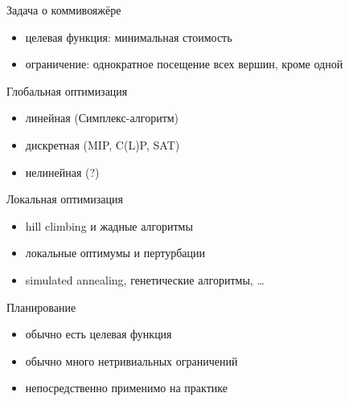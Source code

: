 \documentclass[10pt]{beamer}
\begin{document}
\begin{frame}{Задача о коммивояжёре}
  \begin{itemize}
  \item целевая функция: минимальная стоимость
  \item ограничение: однократное посещение всех вершин, кроме одной
  \end{itemize}
  \begin{center}
  \end{center}
\end{frame}

\begin{frame}{Глобальная оптимизация}
  \begin{itemize}
  \item линейная (Симплекс-алгоритм)
  \item дискретная (MIP, C(L)P, SAT)
  \item нелинейная (?)
  \end{itemize}
\end{frame}

\begin{frame}{Локальная оптимизация}
  \begin{itemize}
  \item hill climbing и жадные алгоритмы
  \item локальные оптимумы и пертурбации
  \item simulated annealing, генетические алгоритмы, …
  \end{itemize}
\end{frame}

\begin{frame}{Планирование}
  \begin{itemize}
  \item обычно есть целевая функция
  \item обычно много нетривиальных ограничений
  \item непосредственно применимо на практике
  \end{itemize}
\end{frame}
\end{document}
